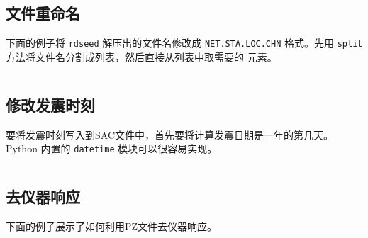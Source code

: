 \subsection{文件重命名}
\label{subsec:rename-in-python}
下面的例子将 \texttt{rdseed} 解压出的文件名修改成 \texttt{NET.STA.LOC.CHN}
格式。先用 \texttt{split} 方法将文件名分割成列表，然后直接从列表中取需要的
元素。
\inputminted{python}{./call-in-script/rename.py}

\subsection{修改发震时刻}
\label{subsec:ch-origin-python}
要将发震时刻写入到SAC文件中，首先要将计算发震日期是一年的第几天。Python
内置的 \texttt{datetime} 模块可以很容易实现。
\inputminted{python}{./call-in-script/ch-origin.py}

\subsection{去仪器响应}
下面的例子展示了如何利用PZ文件去仪器响应。
\inputminted{python}{./call-in-script/transfer.py}

